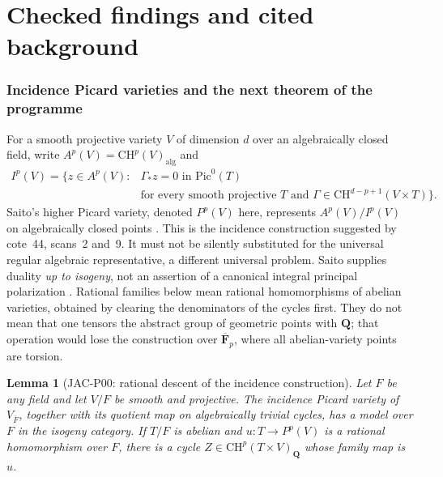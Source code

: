 \documentclass[11pt,a4paper]{article}
\newtheorem{lemma}[theorem]{Lemma}
\begin{document}
\part{Checked findings and cited background}

\section{Incidence Picard varieties and the next theorem of the programme}

For a smooth projective variety $V$ of dimension $d$ over an algebraically
closed field, write $A^p(V)=\mathrm{CH}^p(V)_{\mathrm{alg}}$ and
\[
\begin{split}
 I^p(V)=\{z\in A^p(V):{}&\Gamma_*z=0\text{ in }\mathrm{Pic}^0(T)\\
 &\text{for every smooth projective }T\text{ and }
 \Gamma\in\mathrm{CH}^{d-p+1}(V\times T)\}.
\end{split}
\]
Saito's higher Picard variety, denoted $P^p(V)$ here, represents
$A^p(V)/I^p(V)$ on algebraically closed points
\cite[Theorem~(3.6)(i)]{Saito1979}.
This is the incidence construction suggested by cote~44, scans~2 and~9.
It must not be silently substituted for the universal regular algebraic
representative, a different universal problem.  Saito supplies duality
\emph{up to isogeny}, not an assertion of a canonical integral principal
polarization \cite[Proposition~(4.4)]{Saito1979}.
Rational families below mean rational homomorphisms of abelian varieties,
obtained by clearing the denominators of the cycles first.  They do not
mean that one tensors the abstract group of geometric points with
$\mathbf Q$; that operation would lose the construction over
$\overline{\mathbf F}_p$, where all abelian-variety points are torsion.

\begin{lemma}[JAC-P00: rational descent of the incidence construction]
\label{jac:P00}
Let $F$ be any field and let $V/F$ be smooth and projective.  The
incidence Picard variety of $V_{\overline F}$, together with its quotient
map on algebraically trivial cycles, has a model over $F$ in the isogeny
category.  If $T/F$ is abelian and $u:T\to P^p(V)$ is a rational
homomorphism over $F$, there is a cycle
$Z\in\mathrm{CH}^p(T\times V)_{\mathbf Q}$ whose family map is $u$.
\end{lemma}
\end{document}

